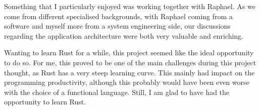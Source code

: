 Something that I particularly enjoyed was working together with Raphael. As we come from different specialised backgrounds, with Raphael coming from a software and myself more from a system engineering side, our discussions regarding the application architecture were both very valuable and enriching.

Wanting to learn Rust for a while, this project seemed like the ideal opportunity to do so. For me, this proved to be one of the main challenges during this project thought, as Rust has a very steep learning curve. This mainly had impact on the programming productivity, although this probably would have been even worse with the choice of a functional language. Still, I am glad to have had the opportunity to learn Rust.
